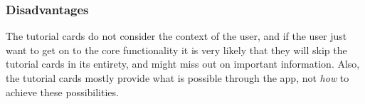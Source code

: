 \subsubsection{Disadvantages}
The tutorial cards do not consider the context of the user, and if the user just want to get on to the core functionality it is very likely that they will skip the tutorial cards in its entirety, and might miss out on important information. Also, the tutorial cards mostly provide what is possible through the app, not \textit{how} to achieve these possibilities.
